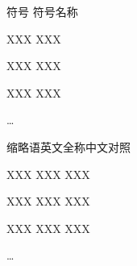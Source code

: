 \XDUpremainmatter

\begin{symbollist}
\item 符号 \hspace{12em} 符号名称
\item XXX \hspace{12.5em} XXX
\item XXX \hspace{12.5em} XXX
\item XXX \hspace{12.5em} XXX
\item \ldots
\end{symbollist}

\begin{abbreviationlist}
\item 缩略语\hspace{6em}英文全称\hspace{6em}中文对照
\item XXX \hspace{7em} XXX \hspace{7.5em} XXX
\item XXX \hspace{7em} XXX \hspace{7.5em} XXX
\item XXX \hspace{7em} XXX \hspace{7.5em} XXX
\item \ldots
\end{abbreviationlist}
